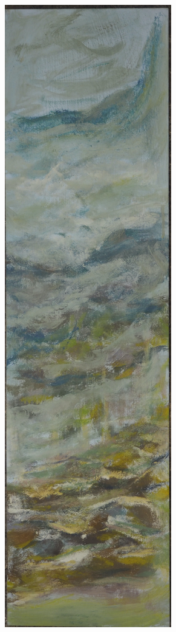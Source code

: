 \documentclass[twoside]{article}
\begin{document}
\begin{center}
    \newpage
    \includegraphics[width=\textwidth,height=\textheight,keepaspectratio]{assets/Tabla2.jpg}

\end{center}
\end{document}
